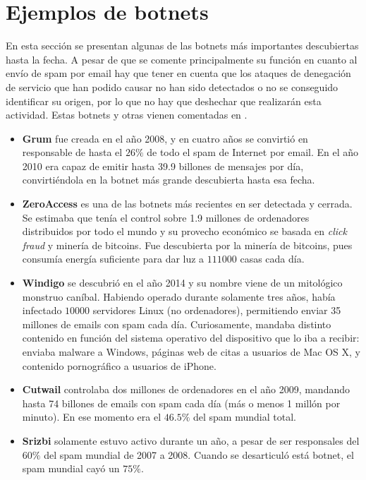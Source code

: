 \section{Ejemplos de botnets}
En esta sección se presentan algunas de las botnets más importantes descubiertas hasta la fecha. A pesar de que se comente principalmente su función en cuanto al envío de spam por email hay que tener en cuenta que los ataques de denegación de servicio que han podido causar no han sido detectados o no se conseguido identificar su origen, por lo que no hay que deshechar que realizarán esta actividad. Estas botnets y otras vienen comentadas en \cite{botnet-ej}.
\begin{itemize}
\item \textbf{Grum} fue creada en el a\~no 2008, y en cuatro a\~nos se convirtió en responsable de hasta el $26\%$ de todo el spam de Internet por email. En el a\~no 2010 era capaz de emitir hasta 39.9 billones de mensajes por día, convirtiéndola en la botnet más grande descubierta hasta esa fecha.
\item \textbf{ZeroAccess} es una de las botnets más recientes en ser detectada y cerrada. Se estimaba que tenía el control sobre 1.9 millones de ordenadores distribuidos por todo el mundo y su provecho económico se basada en \textit{click fraud} y minería de bitcoins. Fue descubierta por la minería de bitcoins, pues consumía energía suficiente para dar luz a $111000$ casas cada día.
\item \textbf{Windigo} se descubrió en el a\~no 2014 y su nombre viene de un mitológico monstruo caníbal. Habiendo operado durante solamente tres a\~nos, había infectado $10000$ servidores Linux (no ordenadores), permitiendo enviar 35 millones de emails con spam cada día. Curiosamente, mandaba distinto contenido en función del sistema operativo del dispositivo que lo iba a recibir: enviaba malware a Windows, páginas web de citas a usuarios de Mac OS X, y contenido pornográfico a usuarios de iPhone.
\item \textbf{Cutwail} controlaba dos millones de ordenadores en el a\~no 2009, mandando hasta 74 billones de emails con spam cada día (más o menos 1 millón por minuto). En ese momento era el $46.5\%$ del spam mundial total.
\item \textbf{Srizbi} solamente estuvo activo durante un a\~no, a pesar de ser responsales del $60\%$ del spam mundial de 2007 a 2008. Cuando se desarticuló está botnet, el spam mundial cayó un $75\%$.
\end{itemize}

